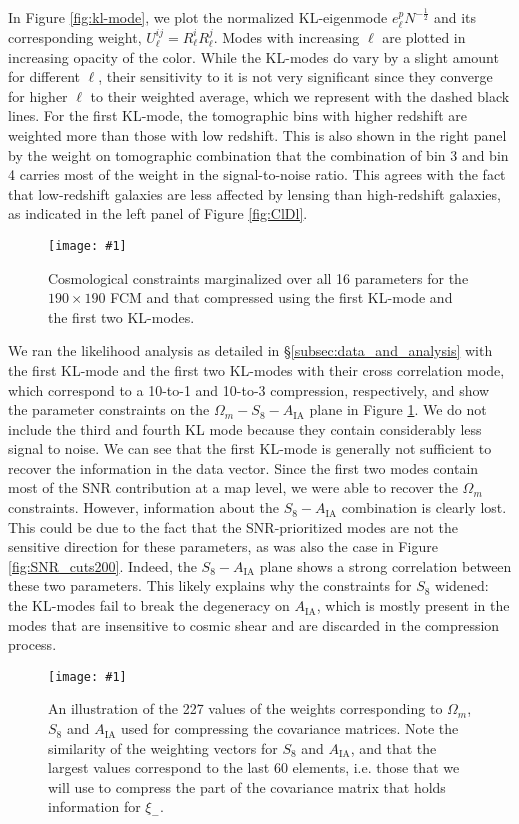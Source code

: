 \documentclass[twocolumn,nofootinbib]{\docclass}
\newcommand{\sfig}[2]{
	\texttt{[image: \#1]}
}
\newcommand{\Sfig}[3]{
	\begin{figure}[#1]
		\sfig{../figures/#2.pdf}{\columnwidth}
		\caption{#3}
		\label{fig:#2}
	\end{figure}
}
\newcommand{\Swide}[3]{
	\begin{figure*}[#1]
		\sfig{../figures/#2.pdf}{\textwidth}
		\caption{#3}
		\label{fig:#2}
	\end{figure*}
}
\newcommand{\rf}[1]{Figure \ref{fig:#1}}
\newcommand{\rssec}[1]{\S\ref{subsec:#1}}
\begin{document}
In \rf{kl-mode}, we plot the normalized KL-eigenmode $e^p_{\ell} N^{-\frac{1}{2}}$ and its corresponding weight, $U^{ij}_\ell=R_\ell^i R_\ell^j$. Modes with increasing $\ell$ are plotted in increasing opacity of the color. While the KL-modes do vary by a slight amount for different $\ell$, their sensitivity to it is not very significant since they converge for higher $\ell$ to their weighted average, which we represent with the dashed black lines. For the first KL-mode, the tomographic bins with higher redshift are weighted more than those with low redshift. This is also shown in the right panel by the weight on tomographic combination that the combination of bin 3 and bin 4 carries most of the weight in the signal-to-noise ratio. This agrees with the fact that low-redshift galaxies are less affected by lensing than high-redshift galaxies, as indicated in the left panel of \rf{ClDl}.

\Sfig{b}{CompKL-constraints_wmS8A}{Cosmological constraints marginalized over all 16 parameters for the  $190 \times 190$ FCM and that compressed using the first KL-mode and the first two KL-modes.}

We ran the likelihood analysis as detailed in \rssec{data_and_analysis} with the first KL-mode and the first two KL-modes with their cross correlation mode, which correspond to a 10-to-1 and 10-to-3 compression, respectively, and show the parameter constraints on the $\Omega_m - S_8 - A_{\text{IA}}$ plane in \rf{CompKL-constraints_wmS8A}. We do not include the third and fourth KL mode because they contain considerably less signal to noise. We can see that the first KL-mode is generally not sufficient to recover the information in the data vector. Since the first two modes contain most of the SNR contribution at a map level, we were able to recover the $\Omega_m$ constraints. However, information about the $S_8-A_{\text{IA}}$ combination is clearly lost. This could be due to the fact that the SNR-prioritized modes are not the sensitive direction for these parameters, as was also the case in \rf{SNR_cuts200}. Indeed, the $S_8 - A_{\text{IA}}$ plane shows a strong correlation between these two parameters. This likely explains why the constraints for $S_8$ widened: the KL-modes fail to break the degeneracy on $A_{\text{IA}}$, which is mostly present in the modes that are insensitive to cosmic shear and are discarded in the compression process.

\Swide{tbp}{Weights_2pt}{An illustration of the 227 values of the weights corresponding to $\Omega_m$, $S_8$ and $A_{\text{IA}}$ used for compressing the covariance matrices. Note the similarity of the weighting vectors for $S_8$ and $A_{\text{IA}}$, and that the largest values correspond to the last 60 elements, i.e. those that we will use to compress the part of the covariance matrix that holds information for $\xi_-$.}
\end{document}
